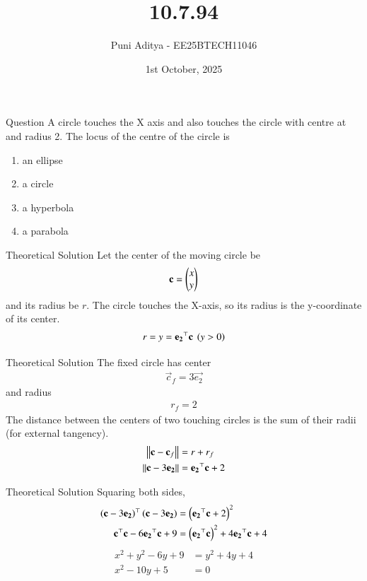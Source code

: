 \documentclass{beamer}
\title{10.7.94}
\date{1st October, 2025}
\author{Puni Aditya - EE25BTECH11046}
\begin{document}
\frame{\titlepage}
\begin{frame}{Question}
A circle touches the X axis and also touches the circle with centre at  and radius 2. The locus of the centre of the circle is
\begin{enumerate}
    \item an ellipse
    \item a circle
    \item a hyperbola
    \item a parabola
\end{enumerate}
\end{frame}

\begin{frame}{Theoretical Solution}
Let the center of the moving circle be 
\begin{align*} 
    \mathbf{c} = \begin{pmatrix}x \\ y\end{pmatrix}
\end{align*}
and its radius be $r$.
The circle touches the X-axis, so its radius is the y-coordinate of its center.
\begin{align}
    r = y = \mathbf{e_2}^\top\mathbf{c} \text{ } \left(y>0\right)
\end{align}
\end{frame}

\begin{frame}{Theoretical Solution}
The fixed circle has center 
\begin{align} 
    \vec{c}_f = 3\vec{e_2}
\end{align} 
and radius 
\begin{align}
    r_f=2
\end{align}
The distance between the centers of two touching circles is the sum of their radii (for external tangency).
\begin{align}
    \left\lVert\mathbf{c}-\mathbf{c}_f\right\rVert &= r + r_f \\
    \left\lVert\mathbf{c}-3\mathbf{e_2}\right\rVert &= \mathbf{e_2}^\top\mathbf{c} + 2
\end{align}
\end{frame}

\begin{frame}{Theoretical Solution}
Squaring both sides,
\begin{align}
    \left(\mathbf{c}-3\mathbf{e_2}\right)^\top\left(\mathbf{c}-3\mathbf{e_2}\right) &= \left(\mathbf{e_2}^\top\mathbf{c} + 2\right)^2 \\
    \mathbf{c}^\top\mathbf{c} - 6\mathbf{e_2}^\top\mathbf{c} + 9 &= \left(\mathbf{e_2}^\top\mathbf{c}\right)^2 + 4\mathbf{e_2}^\top\mathbf{c} + 4
\end{align}
\begin{align}
    x^2 + y^2 - 6y + 9 &= y^2 + 4y + 4 \\
    x^2 - 10y + 5 &= 0
\end{align}
\end{frame}
\end{document}
